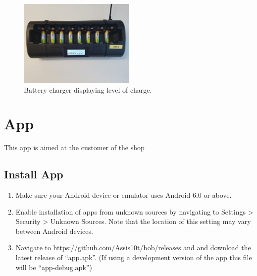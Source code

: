 \documentclass[onecolumn]{IEEEtran}
\begin{document}
\begin{figure}[H]
    \begin{center}
    \includegraphics[width=0.5\textwidth]{battery-recharge.jpg}
    \caption{Battery charger displaying level of charge.}
    \label{fig: figure}
    \end{center}
\end{figure}

{\let\clearpage\relax \section{App}}
This app is aimed at the customer of the shop

\subsection{Install App}
\begin{enumerate}
    \item Make sure your Android device or emulator uses Android 6.0 or above. 
    \item Enable installation of apps from unknown sources by navigating to Settings > Security > Unknown Sources. Note that the location of this setting may vary between Android devices.
    \item Navigate to https://github.com/Assis10t/bob/releases and and download the latest release of “app.apk”. (If using a development version of the app this file will be “app-debug.apk”) 
\end{enumerate}
\end{document}
